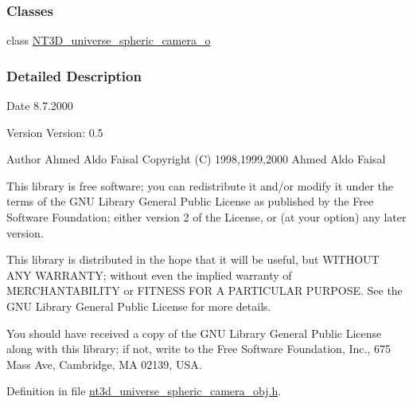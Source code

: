 \subsubsection*{Classes}
\begin{DoxyCompactItemize}
\item 
class \hyperlink{class_n_t3_d__universe__spheric__camera__o}{NT3D\_\-universe\_\-spheric\_\-camera\_\-o}
\end{DoxyCompactItemize}


\subsubsection{Detailed Description}
\begin{DoxyDate}{Date}
8.7.2000
\end{DoxyDate}
\begin{DoxyVersion}{Version}
Version: 0.5 
\end{DoxyVersion}
\begin{DoxyAuthor}{Author}
Ahmed Aldo Faisal Copyright (C) 1998,1999,2000 Ahmed Aldo Faisal
\end{DoxyAuthor}
This library is free software; you can redistribute it and/or modify it under the terms of the GNU Library General Public License as published by the Free Software Foundation; either version 2 of the License, or (at your option) any later version.

This library is distributed in the hope that it will be useful, but WITHOUT ANY WARRANTY; without even the implied warranty of MERCHANTABILITY or FITNESS FOR A PARTICULAR PURPOSE. See the GNU Library General Public License for more details.

You should have received a copy of the GNU Library General Public License along with this library; if not, write to the Free Software Foundation, Inc., 675 Mass Ave, Cambridge, MA 02139, USA. 

Definition in file \hyperlink{nt3d__universe__spheric__camera__obj_8h_source}{nt3d\_\-universe\_\-spheric\_\-camera\_\-obj.h}.

